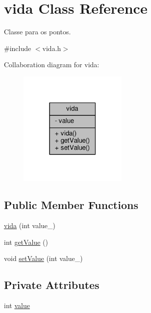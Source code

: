 \hypertarget{classvida}{}\section{vida Class Reference}
\label{classvida}


Classe para os pontos.  




{\ttfamily \#include $<$vida.\+h$>$}



Collaboration diagram for vida\+:\nopagebreak
\begin{figure}[H]
\begin{center}
\leavevmode
\includegraphics[width=150pt]{classvida__coll__graph}
\end{center}
\end{figure}
\subsection*{Public Member Functions}
\begin{DoxyCompactItemize}
\item 
\hyperlink{classvida_ad384ba4be61ab721939ebd0a7ed818b8}{vida} (int value\+\_\+)
\item 
int \hyperlink{classvida_aff59d5fa0f254f27c938bf26d5ea69d1}{get\+Value} ()
\item 
void \hyperlink{classvida_a0aa2965112fb4a5cd4497a2fc4d01544}{set\+Value} (int value\+\_\+)
\end{DoxyCompactItemize}
\subsection*{Private Attributes}
\begin{DoxyCompactItemize}
\item 
int \hyperlink{classvida_ae9dec2f5055b4b7b7a67be0d3c344ba4}{value}
\end{DoxyCompactItemize}


